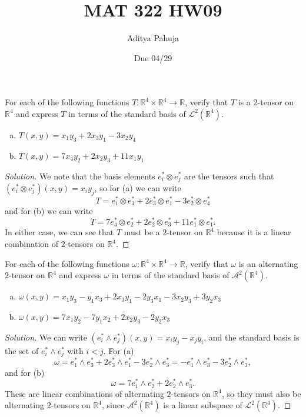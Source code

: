 \documentclass[10pt]{scrartcl}
\title{\vspace{-2em}MAT 322 HW09}
\author{\large Aditya Pahuja}
\date{\large Due 04/29}
\providecommand{\RR}{\mathbb R}
\providecommand{\ii}{\item}
\newenvironment{soln}{\begin{proof}[Solution]}{\end{proof}}
\begin{document}
\maketitle

\begin{problem}
	For each of the following functions $T\colon\RR^4\times\RR^4\to\RR$,
	verify that $T$ is a $2$-tensor on $\RR^4$ and express $T$
	in terms of the standard basis of $\mathcal L^2(\RR^4)$.
	\begin{enumerate}[(a)]
		\ii $T(x,y)=x_1y_3+2x_3y_1-3x_2y_4$
		\ii $T(x,y)=7x_4y_2+2x_2y_3+11x_1y_1$
	\end{enumerate}
\end{problem}

\begin{soln}
	We note that the basis elements $e_i^*\otimes e_j^*$ are the tensors
	such that $(e_i^*\otimes e_j^*)(x,y) = x_iy_j$, so for (a) we can write
	\[T = e_1^*\otimes e_3^* + 2e_3^*\otimes e_1^* - 3e_2^*\otimes e_4^*\]
	and for (b) we can write
	\[T = 7e_4^*\otimes e_2^* + 2e_2^*\otimes e_3^* + 11e_1^*\otimes e_1^*.\]
	In either case, we can see that $T$ must be a $2$-tensor on $\RR^4$
	because it is a linear combination of $2$-tensors on $\RR^4$.
\end{soln}

\begin{problem}
	For each of the following functions $\omega\colon\RR^4\times\RR^4\to\RR$,
	verify that $\omega$ is an alternating $2$-tensor on $\RR^4$ and
	express $\omega$ in terms of the standard basis of $\mathcal A^2(\RR^4)$.
	\begin{enumerate}[(a)]
		\ii $\omega(x,y)=x_1y_3-y_1x_3 + 2x_3y_1-2y_3x_1 - 3x_2y_3+3y_2x_3$
		\ii $\omega(x,y)=7x_1y_2-7y_1x_2 + 2x_2y_3-2y_2x_3$
	\end{enumerate}
\end{problem}

\begin{soln}
	We can write $(e_i^*\wedge e_j^*)(x,y) = x_iy_j - x_jy_i$,
	and the standard basis is the set of $e_i^*\wedge e_j^*$ with $i<j$.
	For (a)
	\[\omega = e_1^*\wedge e_3^* + 2e_3^*\wedge e_1^* - 3e_2^*\wedge e_3^*
	= -e_1^*\wedge e_3^* - 3e_2^*\wedge e_3^*,\]
	and for (b)
	\[\omega = 7e_1^*\wedge e_2^* + 2e_2^*\wedge e_3^*.\]
	These are linear combinations of alternating $2$-tensors on $\RR^4$,
	so they must also be alternating $2$-tensors on $\RR^4$,
	since $\mathcal A^2(\RR^4)$ is a linear subspace of $\mathcal L^2(\RR^4)$.
\end{soln}
\end{document}
